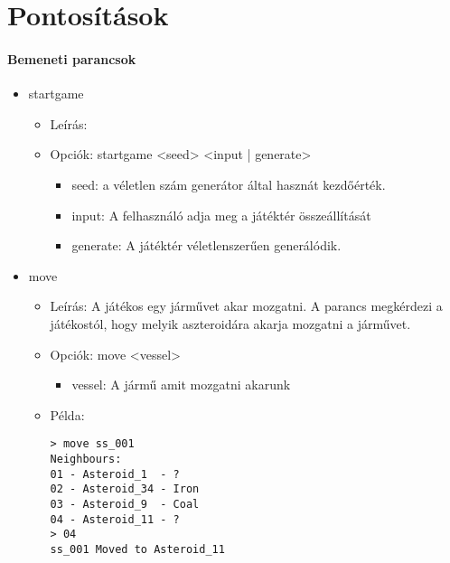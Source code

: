 \documentclass[../../projlab]{subfiles}
\begin{document}
\makeatletter


\makeatother

\chapter{Pontosítások}

\subsubsection{Bemeneti parancsok}

\begin{itemize}
    \item startgame
    \begin{itemize}
        \item Leírás: 
        \item Opciók: startgame <seed> <input | generate>
        \begin{itemize}
            \item seed: a véletlen szám generátor által hasznát kezdőérték.
            \item input: A felhasználó adja meg a játéktér összeállítását
            \item generate: A játéktér véletlenszerűen generálódik.
        \end{itemize}
    \end{itemize}

    \item move
    \begin{itemize}
        \item Leírás: A játékos egy járművet akar mozgatni. \newline
            A parancs megkérdezi a játékostól, hogy melyik aszteroidára akarja mozgatni a járművet.
        \item Opciók: move <vessel>
        \begin{itemize}
            \item vessel: A jármű amit mozgatni akarunk
        \end{itemize}
        \item Példa:
            \begin{verbatim}
> move ss_001
Neighbours:
01 - Asteroid_1  - ?
02 - Asteroid_34 - Iron
03 - Asteroid_9  - Coal
04 - Asteroid_11 - ?
> 04
ss_001 Moved to Asteroid_11
            \end{verbatim}
    \end{itemize}



\end{itemize}
\end{document}
